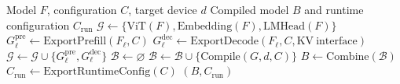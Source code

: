 \documentclass[11pt]{article}
\begin{document}
\begin{minipage}{17cm}
\begin{algorithm}[H]
\caption{Qwen3-VL Subgraph Export and Compilation}
\begin{algorithmic}[1]
\Require Model $F$, configuration $C$, target device $d$
\Ensure Compiled model $B$ and runtime configuration $C_{\mathrm{run}}$
\State $\mathcal{G} \gets \{\mathrm{ViT}(F),\mathrm{Embedding}(F),\mathrm{LMHead}(F)\}$
    \State $G_{\ell}^{\mathrm{pre}} \gets \mathrm{ExportPrefill}(F_{\ell}, C)$
    \State $G_{\ell}^{\mathrm{dec}} \gets \mathrm{ExportDecode}(F_{\ell}, C, \mathrm{KV\ interface})$
    \State $\mathcal{G} \gets \mathcal{G} \cup \{G_{\ell}^{\mathrm{pre}},G_{\ell}^{\mathrm{dec}}\}$
\EndFor
\State $\mathcal{B} \gets \varnothing$
    \State $\mathcal{B} \gets \mathcal{B} \cup \{\mathrm{Compile}(G,d,C)\}$
\EndFor
\State $B \gets \mathrm{Combine}(\mathcal{B})$
\State $C_{\mathrm{run}} \gets \mathrm{ExportRuntimeConfig}(C)$
\State \Return $(B,C_{\mathrm{run}})$
\end{algorithmic}
\end{algorithm}
\end{minipage}
\end{document}
